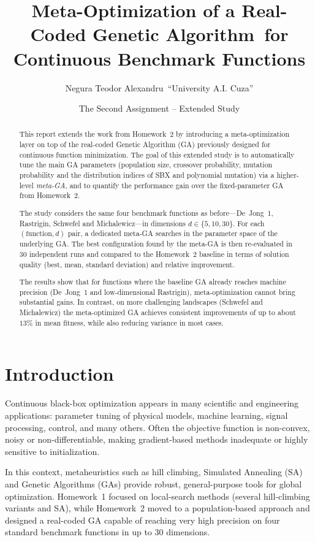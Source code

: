 \documentclass[11pt]{article}
\title{Meta-Optimization of a Real-Coded Genetic Algorithm\
for Continuous Benchmark Functions}
\author{Negura Teodor Alexandru\
{\small ``University A.I. Cuza''}}
\date{The Second Assignment -- Extended Study}
\begin{document}
\maketitle

\begin{abstract}
This report extends the work from Homework~2 by introducing a meta-optimization
layer on top of the real-coded Genetic Algorithm (GA) previously designed for
continuous function minimization.
The goal of this extended study is to automatically tune the main GA parameters
(population size, crossover probability, mutation probability and the
distribution indices of SBX and polynomial mutation) via a higher-level
\emph{meta-GA}, and to quantify the performance gain over the fixed-parameter
GA from Homework~2.

The study considers the same four benchmark functions as before---De~Jong~1,
Rastrigin, Schwefel and Michalewicz---in dimensions $d \in \{5,10,30\}$.
For each $(\text{function}, d)$ pair, a dedicated meta-GA searches in the
parameter space of the underlying GA.
The best configuration found by the meta-GA is then re-evaluated in 30
independent runs and compared to the Homework~2 baseline in terms of solution
quality (best, mean, standard deviation) and relative improvement.

The results show that for functions where the baseline GA already reaches
machine precision (De~Jong~1 and low-dimensional Rastrigin), meta-optimization
cannot bring substantial gains.
In contrast, on more challenging landscapes (Schwefel and Michalewicz) the
meta-optimized GA achieves consistent improvements of up to about
$13\%$ in mean fitness, while also reducing variance in most cases.
\end{abstract}

\section{Introduction}

Continuous black-box optimization appears in many scientific and engineering
applications: parameter tuning of physical models, machine learning,
signal processing, control, and many others.
Often the objective function is non-convex, noisy or non-differentiable,
making gradient-based methods inadequate or highly sensitive to initialization.

In this context, metaheuristics such as hill climbing, Simulated Annealing
(SA) and Genetic Algorithms (GAs) provide robust, general-purpose tools for
global optimization.
Homework~1 focused on local-search methods (several hill-climbing variants
and SA), while Homework~2 moved to a population-based approach and designed
a real-coded GA capable of reaching very high precision on four standard
benchmark functions in up to 30 dimensions.
\end{document}
